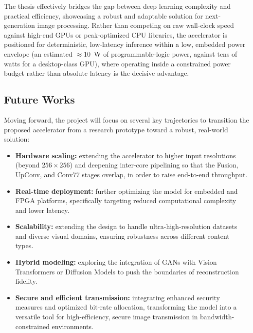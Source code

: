 The thesis effectively bridges the gap between deep learning complexity and practical efficiency, showcasing a robust and adaptable solution for next-generation image processing. Rather than competing on raw wall-clock speed against high-end GPUs or peak-optimized CPU libraries, the accelerator is positioned for deterministic, low-latency inference within a low, embedded power envelope (an estimated $\approx$10~W of programmable-logic power, against tens of watts for a desktop-class GPU), where operating inside a constrained power budget rather than absolute latency is the decisive advantage.

\subsection*{Future Works}

Moving forward, the project will focus on several key trajectories to transition the proposed accelerator from a research prototype toward a robust, real-world solution:
\begin{itemize}
    \item \textbf{Hardware scaling:} extending the accelerator to higher input resolutions (beyond $256\times256$) and deepening inter-core pipelining so that the Fusion, UpConv, and Conv77 stages overlap, in order to raise end-to-end throughput.
    \item \textbf{Real-time deployment:} further optimizing the model for embedded and FPGA platforms, specifically targeting reduced computational complexity and lower latency.
    \item \textbf{Scalability:} extending the design to handle ultra-high-resolution datasets and diverse visual domains, ensuring robustness across different content types.
    \item \textbf{Hybrid modeling:} exploring the integration of GANs with Vision Transformers or Diffusion Models to push the boundaries of reconstruction fidelity.
    \item \textbf{Secure and efficient transmission:} integrating enhanced security measures and optimized bit-rate allocation, transforming the model into a versatile tool for high-efficiency, secure image transmission in bandwidth-constrained environments.
\end{itemize}
